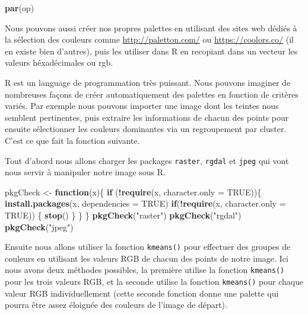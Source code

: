 \documentclass[]{book}
\newenvironment{Shaded}{\begin{snugshade}}{\end{snugshade}}
\newcommand{\ControlFlowTok}[1]{\textcolor[rgb]{0.13,0.29,0.53}{\textbf{#1}}}
\newcommand{\DataTypeTok}[1]{\textcolor[rgb]{0.13,0.29,0.53}{#1}}
\newcommand{\KeywordTok}[1]{\textcolor[rgb]{0.13,0.29,0.53}{\textbf{#1}}}
\newcommand{\NormalTok}[1]{#1}
\newcommand{\OperatorTok}[1]{\textcolor[rgb]{0.81,0.36,0.00}{\textbf{#1}}}
\newcommand{\OtherTok}[1]{\textcolor[rgb]{0.56,0.35,0.01}{#1}}
\newcommand{\StringTok}[1]{\textcolor[rgb]{0.31,0.60,0.02}{#1}}
\begin{document}
\begin{Shaded}
\begin{Highlighting}[]
\KeywordTok{par}\NormalTok{(op)}
\end{Highlighting}
\end{Shaded}

Nous pouvons aussi créer nos propres palettes en utilisant des sites web dédiés à la sélection des couleurs comme \url{http://paletton.com/} ou \url{https://coolors.co/} (il en existe bien d'autres), puis les utiliser dans R en recopiant dans un vecteur les valeurs héxadécimales ou rgb.

R est un language de programmation très puissant. Nous pouvons imaginer de nombreuses façons de créer automatiquement des palettes en fonction de critères variés. Par exemple nous pouvons importer une image dont les teintes nous semblent pertinentes, puis extraire les informations de chacun des points pour ensuite sélectionner les couleurs dominantes via un regroupement par cluster. C'est ce que fait la fonction suivante.

Tout d'abord nous allons charger les packages \texttt{raster}, \texttt{rgdal} et \texttt{jpeg} qui vont nous servir à manipuler notre image sous R.

\begin{Shaded}
\begin{Highlighting}[]
\NormalTok{pkgCheck <-}\StringTok{ }\ControlFlowTok{function}\NormalTok{(x)\{ }
    \ControlFlowTok{if}\NormalTok{ (}\OperatorTok{!}\KeywordTok{require}\NormalTok{(x, }\DataTypeTok{character.only =} \OtherTok{TRUE}\NormalTok{))\{}
        \KeywordTok{install.packages}\NormalTok{(x, }\DataTypeTok{dependencies =} \OtherTok{TRUE}\NormalTok{)}
        \ControlFlowTok{if}\NormalTok{(}\OperatorTok{!}\KeywordTok{require}\NormalTok{(x, }\DataTypeTok{character.only =} \OtherTok{TRUE}\NormalTok{)) \{}
            \KeywordTok{stop}\NormalTok{()}
\NormalTok{        \}}
\NormalTok{    \}}
\NormalTok{\}}
\KeywordTok{pkgCheck}\NormalTok{(}\StringTok{"raster"}\NormalTok{)}
\KeywordTok{pkgCheck}\NormalTok{(}\StringTok{"rgdal"}\NormalTok{)}
\KeywordTok{pkgCheck}\NormalTok{(}\StringTok{"jpeg"}\NormalTok{)}
\end{Highlighting}
\end{Shaded}

Ensuite nous allons utiliser la fonction \texttt{kmeans()} pour effectuer des groupes de couleurs en utilisant les valeurs RGB de chacun des points de notre image. Ici nous avons deux méthodes possibles, la première utilise la fonction \texttt{kmeans()} pour les trois valeurs RGB, et la seconde utilise la fonction \texttt{kmeans()} pour chaque valeur RGB individuellement (cette seconde fonction donne une palette qui pourra être assez éloignée des couleurs de l'image de départ).
\end{document}
